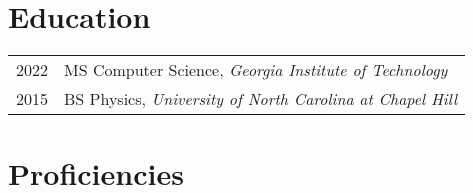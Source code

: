 \documentclass[a4paper,10pt]{article} %
\begin{document}

\section{Education}

\begin{tabular}{rl}	
2022 & MS Computer Science, \emph{Georgia Institute of Technology}\\
2015 & BS Physics, \emph{University of North Carolina at Chapel Hill}\\




\end{tabular}


\section{Proficiencies}
\end{document}
